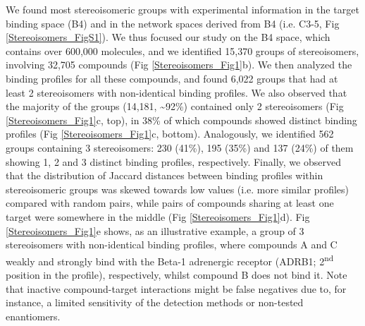 We found most stereoisomeric groups with experimental information in the target binding space (B4) and in the network spaces derived from B4 (i.e. C3-5, Fig \ref{Stereoisomers_FigS1}). We thus focused our study on the B4 space, which contains over 600,000 molecules, and we identified 15,370 groups of stereoisomers, involving 32,705 compounds (Fig \ref{Stereoisomers_Fig1}b). We then analyzed the binding profiles for all these compounds, and found 6,022 groups that had at least 2 stereoisomers with non-identical binding profiles. We also observed that the majority of the groups (14,181, \textasciitilde92\%) contained only 2 stereoisomers (Fig \ref{Stereoisomers_Fig1}c, top), in 38\% of which compounds showed distinct binding profiles (Fig \ref{Stereoisomers_Fig1}c, bottom). Analogously, we identified 562 groups containing 3 stereoisomers: 230 (41\%), 195 (35\%) and 137 (24\%) of them showing 1, 2 and 3 distinct binding profiles, respectively. Finally, we observed that the distribution of Jaccard distances between binding profiles within stereoisomeric groups was skewed towards low values (i.e. more similar profiles) compared with random pairs, while pairs of compounds sharing at least one target were somewhere in the middle (Fig \ref{Stereoisomers_Fig1}d). Fig \ref{Stereoisomers_Fig1}e shows, as an illustrative example, a group of 3 stereoisomers with non-identical binding profiles, where compounds A and C weakly and strongly bind with the Beta-1 adrenergic receptor (ADRB1; 2\textsuperscript{nd} position in the profile), respectively, whilst compound B does not bind it. Note that inactive compound-target interactions might be false negatives due to, for instance, a limited sensitivity of the detection methods or non-tested enantiomers.


